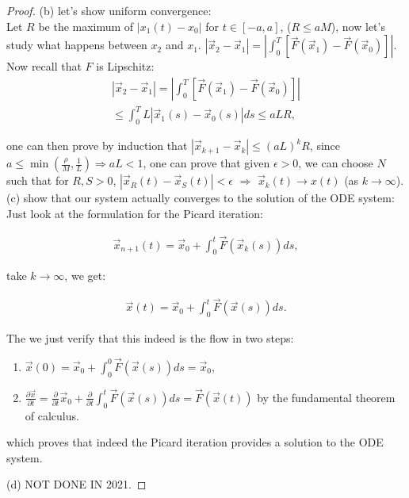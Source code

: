\begin{proof}
    \noindent (b) let's show uniform convergence: \\

    Let $R$ be the maximum of $|x_1(t)-x_0|$ for $t \in [-a,a]$, ($R \leq aM$), now let's study what happens between $x_2$ and $x_1$. $|\vec{x}_2 - \vec{x}_1| = |\int_0^T \left[ \vec{F}(\vec{x}_1) - \vec{F}(\vec{x}_0) \right]|$. \\ 

    Now recall that $F$ is Lipschitz:
    \begin{align*}
        |\vec{x}_2 - \vec{x}_1| = |\int_0^T \left[ \vec{F}(\vec{x}_1) - \vec{F}(\vec{x}_0) \right]|\\
        \leq \int_0^T L |\vec{x}_1(s) - \vec{x}_0(s)| ds \leq aLR,
    \end{align*}

    one can then prove by induction that $|\vec{x}_{k+1} - \vec{x}_k| \leq (aL)^k R$, since $a \leq \min \left( \frac{\rho}{M}, \frac{1}{L} \right) \Rightarrow aL < 1$, one can prove that given $\epsilon > 0$, we can choose $N$ such that for $R,S > 0$, $|\vec{x}_R(t) - \vec{x}_S(t)| < \epsilon$ $\Rightarrow$ $\vec{x}_k(t) \rightarrow x(t)$ (as $k \rightarrow \infty$). \\

    \noindent (c)  show that our system actually converges to the solution of the ODE system: \\

    Just look at the formulation for the Picard iteration: 

    \begin{align*}
        \vec{x}_{n+1}(t) = \vec{x}_0 + \int_0^t \vec{F}(\vec{x}_k(s))ds,
    \end{align*}

    take $k \rightarrow \infty$, we get:

    \begin{align*} 
        \vec{x}(t) = \vec{x}_0 + \int^t_0 \vec{F}(\vec{x}(s)) ds.
    \end{align*}

    The we just verify that this indeed is the flow in two steps: 

    \begin{enumerate}[label=(\roman*)]
        \item $\vec{x}(0) = \vec{x}_0 + \int^0_0 \vec{F}(\vec{x}(s)) ds =  \vec{x}_0$,
        \item $\frac{\partial \vec{x}}{\partial t} = \frac{\partial}{\partial t} \vec{x}_0 + \frac{\partial }{\partial t}\int^t_0 \vec{F}(\vec{x}(s)) ds =  \vec{F}(\vec{x}(t))$ by the fundamental theorem of calculus.
    \end{enumerate}

    which proves that indeed the Picard iteration provides a solution to the ODE system.

    \noindent (d)  NOT DONE IN 2021.

\end{proof}

